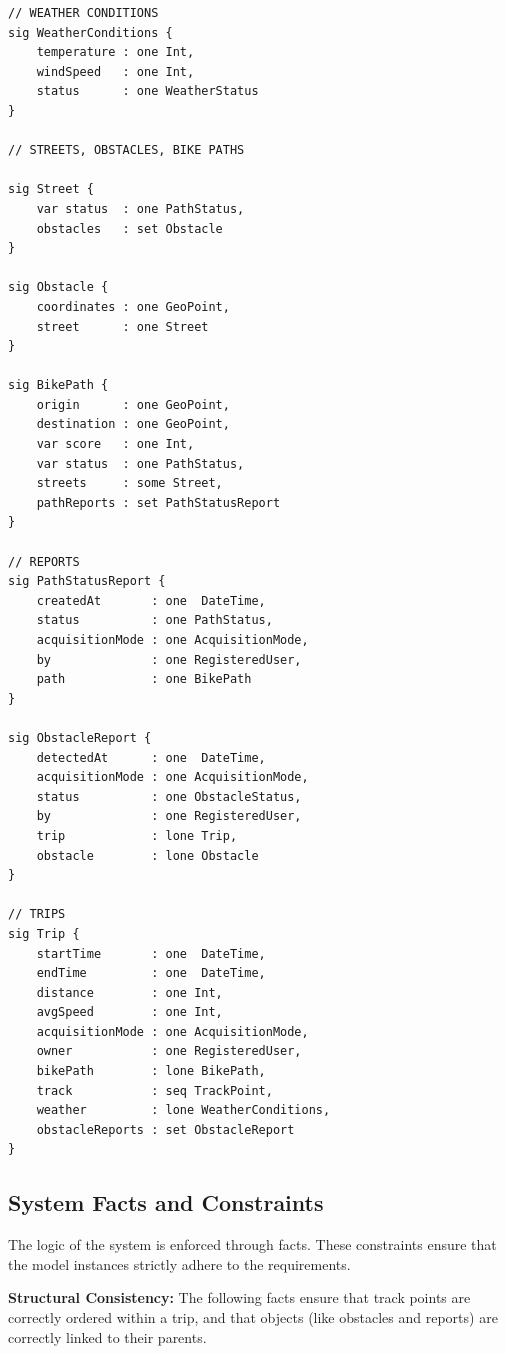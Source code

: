 \begin{lstlisting}[language=Alloy]
// WEATHER CONDITIONS
sig WeatherConditions {
    temperature : one Int,
    windSpeed   : one Int,
    status      : one WeatherStatus
}

// STREETS, OBSTACLES, BIKE PATHS

sig Street {
    var status  : one PathStatus,
    obstacles   : set Obstacle
}

sig Obstacle {
    coordinates : one GeoPoint,
    street      : one Street
}

sig BikePath {
    origin      : one GeoPoint,
    destination : one GeoPoint,
    var score   : one Int,
    var status  : one PathStatus,
    streets     : some Street,
    pathReports : set PathStatusReport
}

// REPORTS
sig PathStatusReport {
    createdAt       : one  DateTime,
    status          : one PathStatus,
    acquisitionMode : one AcquisitionMode,
    by              : one RegisteredUser,
    path            : one BikePath
}

sig ObstacleReport {
    detectedAt      : one  DateTime,
    acquisitionMode : one AcquisitionMode,
    status          : one ObstacleStatus,
    by              : one RegisteredUser,
    trip            : lone Trip,
    obstacle        : lone Obstacle
}

// TRIPS
sig Trip {
    startTime       : one  DateTime,
    endTime         : one  DateTime,
    distance        : one Int,
    avgSpeed        : one Int,
    acquisitionMode : one AcquisitionMode,
    owner           : one RegisteredUser,
    bikePath        : lone BikePath,
    track           : seq TrackPoint,
    weather         : lone WeatherConditions,
    obstacleReports : set ObstacleReport
}

\end{lstlisting}

\subsection{System Facts and Constraints}
\par
The logic of the system is enforced through facts. These constraints ensure that the model instances strictly adhere to the requirements.

\par
\textbf{Structural Consistency:}
The following facts ensure that track points are correctly ordered within a trip, and that objects (like obstacles and reports) are correctly linked to their parents.

